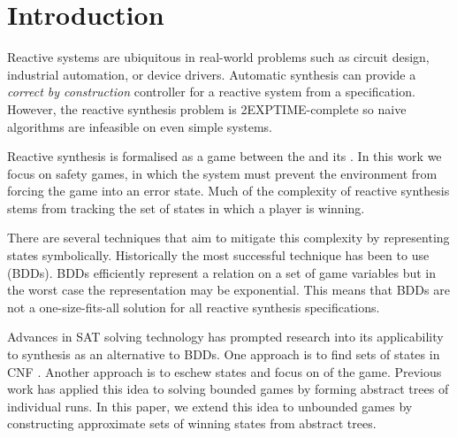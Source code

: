 \section{Introduction}

Reactive systems are ubiquitous in real-world problems such as circuit design,
industrial automation, or device drivers. Automatic synthesis can provide a
\textit{correct by construction} controller for a reactive system from a
specification.  However, the reactive synthesis problem is 2EXPTIME-complete so
naive algorithms are infeasible on even simple systems.

Reactive synthesis is formalised as a game between the  and its
. In this work we focus on safety games, in which the system
must prevent the environment from forcing the game into an error state. Much of
the complexity of reactive synthesis stems from tracking the set of states in
which a player is winning.

There are several techniques that aim to mitigate this complexity by
representing states symbolically.  Historically the most successful technique
has been to use  (BDDs).  BDDs efficiently
represent a relation on a set of game variables but in the worst case the
representation may be exponential. This means that BDDs are not a
one-size-fits-all solution for all reactive synthesis specifications.

Advances in SAT solving technology has prompted research into its applicability
to synthesis as an alternative to BDDs. One approach is to find sets of states
in CNF . Another approach is to eschew states and focus on
 of the game. Previous work has applied this idea to solving
bounded games \cite{nina} by forming abstract trees of individual runs. In this
paper, we extend this idea to unbounded games by constructing approximate sets
of winning states from abstract trees.
